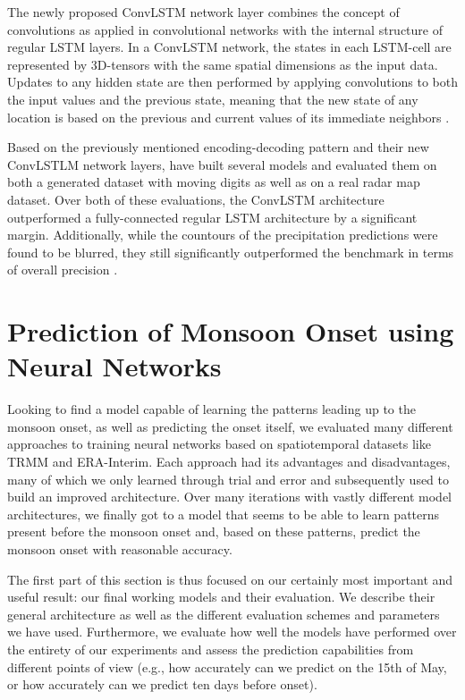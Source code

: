 The newly proposed ConvLSTM network layer combines the concept of convolutions as applied in convolutional networks with the internal structure of regular LSTM layers. In a ConvLSTM network, the states in each LSTM-cell are represented by 3D-tensors with the same spatial dimensions as the input data. Updates to any hidden state are then performed by applying convolutions to both the input values and the previous state, meaning that the new state of any location is based on the previous and current values of its immediate neighbors \citep{Shi.2015}.

Based on the previously mentioned encoding-decoding pattern and their new ConvLSTLM network layers, \citet{Shi.2015} have built several models and evaluated them on both a generated dataset with moving digits as well as on a real radar map dataset. Over both of these evaluations, the ConvLSTM architecture outperformed a fully-connected regular LSTM architecture by a significant margin. Additionally, while the countours of the precipitation predictions were found to be blurred, they still significantly outperformed the benchmark in terms of overall precision \citep{Shi.2015}.

\newpage
\section{Prediction of Monsoon Onset using Neural Networks}
\label{st:nn_implementation}
Looking to find a model capable of learning the patterns leading up to the monsoon onset, as well as predicting the onset itself, we evaluated many different approaches to training neural networks based on spatiotemporal datasets like TRMM and ERA-Interim. Each approach had its advantages and disadvantages, many of which we only learned through trial and error and subsequently used to build an improved architecture. Over many iterations with vastly different model architectures, we finally got to a model that seems to be able to learn patterns present before the monsoon onset and, based on these patterns, predict the monsoon onset with reasonable accuracy.

The first part of this section is thus focused on our certainly most important and useful result: our final working models and their evaluation. We describe their general architecture as well as the different evaluation schemes and parameters we have used. Furthermore, we evaluate how well the models have performed over the entirety of our experiments and assess the prediction capabilities from different points of view (e.g., how accurately can we predict on the 15th of May, or how accurately can we predict ten days before onset).

